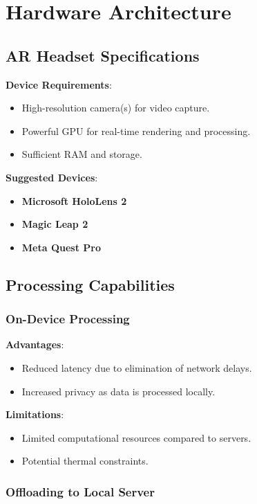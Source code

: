 \documentclass{article}
\begin{document}
\section{Hardware Architecture}

\subsection{AR Headset Specifications}

\textbf{Device Requirements}:
\begin{itemize}
    \item High-resolution camera(s) for video capture.
    \item Powerful GPU for real-time rendering and processing.
    \item Sufficient RAM and storage.
\end{itemize}

\textbf{Suggested Devices}:
\begin{itemize}
    \item \textbf{Microsoft HoloLens 2}
    \item \textbf{Magic Leap 2}
    \item \textbf{Meta Quest Pro}
\end{itemize}

\subsection{Processing Capabilities}

\subsubsection{On-Device Processing}

\textbf{Advantages}:
\begin{itemize}
    \item Reduced latency due to elimination of network delays.
    \item Increased privacy as data is processed locally.
\end{itemize}

\textbf{Limitations}:
\begin{itemize}
    \item Limited computational resources compared to servers.
    \item Potential thermal constraints.
\end{itemize}

\subsubsection{Offloading to Local Server}
\end{document}

